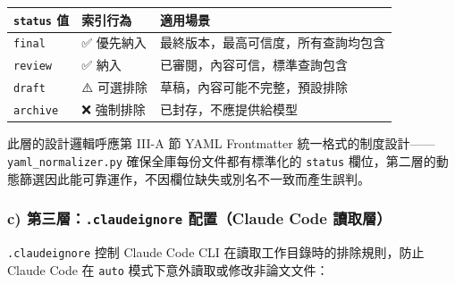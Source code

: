 {\def\LTcaptype{none} %
\begin{longtable}[]{@{}lll@{}}
\toprule\noalign{}
\texttt{status} 值 & 索引行為 & 適用場景 \\
\midrule\noalign{}
\endhead
\bottomrule\noalign{}
\endlastfoot
\texttt{final} & ✅ 優先納入 & 最終版本，最高可信度，所有查詢均包含 \\
\texttt{review} & ✅ 納入 & 已審閱，內容可信，標準查詢包含 \\
\texttt{draft} & ⚠️ 可選排除 & 草稿，內容可能不完整，預設排除 \\
\texttt{archive} & ❌ 強制排除 & 已封存，不應提供給模型 \\
\end{longtable}
}

\begin{Shaded}
\begin{Highlighting}[]
\OperatorTok{=}\NormalTok{) }\OperatorTok{{-}\textgreater{}} \NormalTok{:}
\OperatorTok{=}\NormalTok{, }\NormalTok{)}
    \OperatorTok{==} \NormalTok{:}
         
    \OperatorTok{==}   
         
     
\end{Highlighting}
\end{Shaded}

此層的設計邏輯呼應第 III-A 節 YAML Frontmatter
統一格式的制度設計------\texttt{yaml\_normalizer.py}
確保全庫每份文件都有標準化的 \texttt{status}
欄位，第二層的動態篩選因此能可靠運作，不因欄位缺失或別名不一致而產生誤判。

\subsubsection{\texorpdfstring{c) 第三層：\texttt{.claudeignore}
配置（Claude Code
讀取層）}{c) 第三層：.claudeignore 配置（Claude Code 讀取層）}}\label{c-ux7b2cux4e09ux5c64.claudeignore-ux914dux7f6eclaude-code-ux8b80ux53d6ux5c64}

\texttt{.claudeignore} 控制 Claude Code CLI
在讀取工作目錄時的排除規則，防止 Claude Code 在 \texttt{auto}
模式下意外讀取或修改非論文文件：

